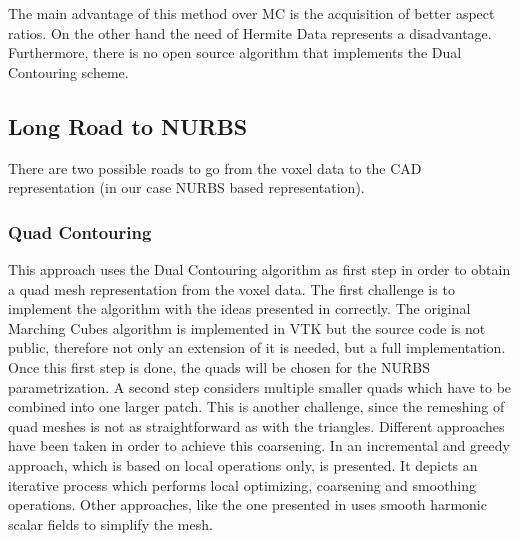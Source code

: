 The main advantage of this method over MC is the acquisition of better aspect ratios. On the other hand the need of Hermite Data
represents a disadvantage. Furthermore, there is no open source algorithm that implements the Dual Contouring scheme.




\subsection{Long Road to NURBS}
There are two possible roads to go from the voxel data to the CAD representation (in our case NURBS based representation).
\subsubsection{Quad Contouring}
This approach uses the Dual Contouring algorithm as first step in order to obtain a quad mesh
representation from the voxel data. The first challenge is to implement the algorithm
with the ideas presented in \cite{Hermite2002} correctly. The original Marching Cubes algorithm is
implemented in VTK but the source code is not public, therefore not only an extension
of it is needed, but a full implementation. Once this first step is done, the quads will be chosen for the
NURBS parametrization. A second step considers multiple smaller quads which have to be
combined into one larger patch. This is another challenge, since the remeshing of quad meshes
is not as straightforward as with the triangles. Different approaches have been taken in order to achieve this coarsening. In \cite{Puppo2010} an incremental and greedy approach, which is based on local operations only, is presented. It depicts an iterative process which performs local optimizing, coarsening and smoothing operations. Other approaches, like the one presented in \cite{Dong2005} uses smooth harmonic scalar fields to simplify the mesh.

